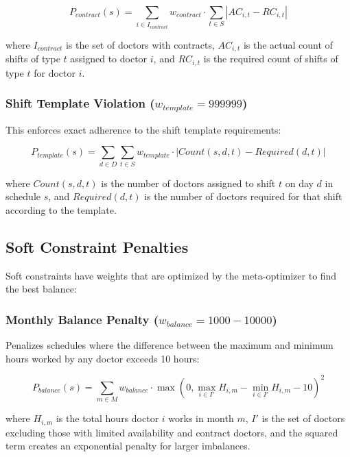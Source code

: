 \documentclass[12pt]{article}
\begin{document}
\begin{equation}
P_{contract}(s) = \sum_{i \in I_{contract}} w_{contract} \cdot \sum_{t \in S} |AC_{i,t} - RC_{i,t}|
\end{equation}

where $I_{contract}$ is the set of doctors with contracts, $AC_{i,t}$ is the actual count of shifts of type $t$ assigned to doctor $i$, and $RC_{i,t}$ is the required count of shifts of type $t$ for doctor $i$.

\subsubsection{Shift Template Violation ($w_{template} = 999999$)}
This enforces exact adherence to the shift template requirements:

\begin{equation}
P_{template}(s) = \sum_{d \in D} \sum_{t \in S} w_{template} \cdot |Count(s,d,t) - Required(d,t)|
\end{equation}

where $Count(s,d,t)$ is the number of doctors assigned to shift $t$ on day $d$ in schedule $s$, and $Required(d,t)$ is the number of doctors required for that shift according to the template.

\subsection{Soft Constraint Penalties}

Soft constraints have weights that are optimized by the meta-optimizer to find the best balance:

\subsubsection{Monthly Balance Penalty ($w_{balance} = 1000-10000$)}
Penalizes schedules where the difference between the maximum and minimum hours worked by any doctor exceeds 10 hours:

\begin{equation}
P_{balance}(s) = \sum_{m \in M} w_{balance} \cdot \max(0, \max_{i \in I'} H_{i,m} - \min_{i \in I'} H_{i,m} - 10)^2
\end{equation}

where $H_{i,m}$ is the total hours doctor $i$ works in month $m$, $I'$ is the set of doctors excluding those with limited availability and contract doctors, and the squared term creates an exponential penalty for larger imbalances.
\end{document}
